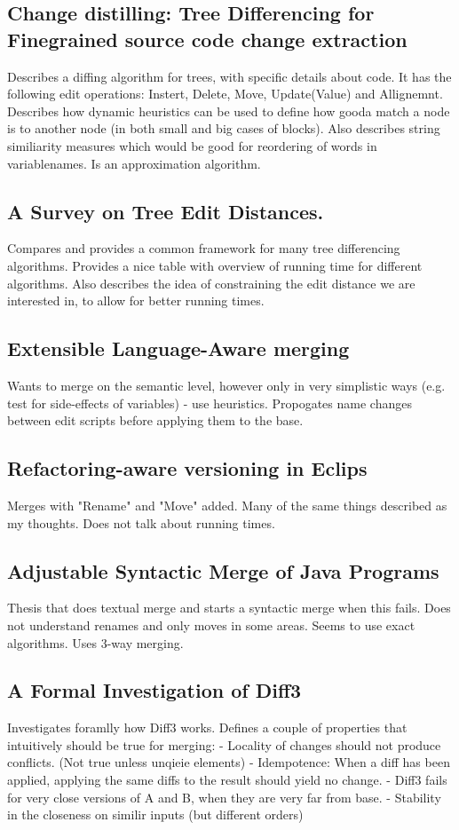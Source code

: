 \documentclass[12pt]{article}
\begin{document}
\subsection{Change distilling: Tree Differencing for Finegrained source code change extraction}
Describes a diffing algorithm for trees, with specific details about code. It has the following edit operations: Instert, Delete, Move, Update(Value) and Allignemnt. Describes how dynamic heuristics can be used to define how gooda match a node is to another node (in both small and big cases of blocks). Also describes string similiarity measures which would be good for reordering of words in variablenames. Is an approximation algorithm.

\subsection{A Survey on Tree Edit Distances.}
Compares and provides a common framework for many tree differencing algorithms. Provides a nice table with overview of running time for different algorithms. Also describes the idea of constraining the edit distance we are interested in, to allow for better running times.

\subsection{Extensible Language-Aware merging}
Wants to merge on the semantic level, however only in very simplistic ways (e.g. test for side-effects of variables) - use heuristics. Propogates name changes between edit scripts before applying them to the base.

\subsection{Refactoring-aware versioning in Eclips}
Merges with "Rename" and "Move" added. Many of the same things described as my thoughts. Does not talk about running times.

\subsection{Adjustable Syntactic Merge of Java Programs}
Thesis that does textual merge and starts a syntactic merge when this fails. Does not understand renames and only moves in some areas. Seems to use exact algorithms. Uses 3-way merging.

\subsection{A Formal Investigation of Diff3}
Investigates foramlly how Diff3 works. Defines a couple of properties that intuitively should be true for merging:
- Locality of changes should not produce conflicts. (Not true unless unqieie elements)
- Idempotence: When a diff has been applied, applying the same diffs to the result should yield no change.
- Diff3 fails for very close versions of A and B, when they are very far from base.
- Stability in the closeness on similir inputs (but different orders)




\end{document}
